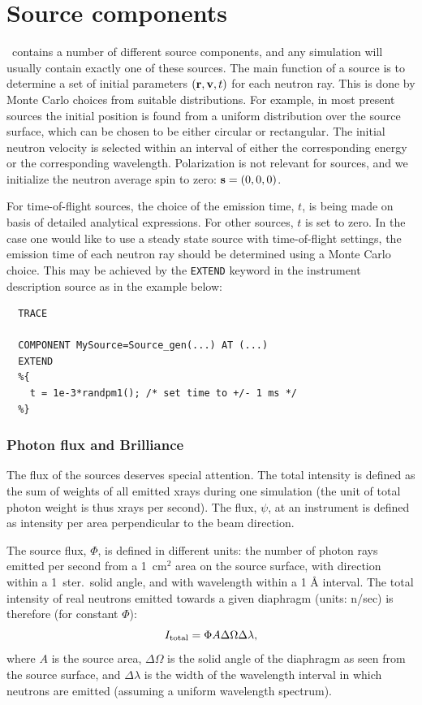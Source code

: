 
\chapter{Source components}
\label{c:source}

\MCS\ contains a number of different source components,
and any simulation will usually contain exactly one of these sources.
The main function of a source is to determine a set of initial
parameters $({\bf r}, {\bf v}, t)$
for each neutron ray. This is done by Monte Carlo choices from
suitable distributions. For example, in most present sources
the initial position is
found from a uniform distribution over the source surface,
which can be chosen to be either circular or rectangular.
The initial neutron velocity is selected within an interval
of either the corresponding energy or the corresponding wavelength.
Polarization is not relevant for sources,
and we initialize the neutron average spin to zero: ${\bf s}=(0,0,0)$.

For time-of-flight sources, the choice of the emission time, $t$,
is being made on basis of detailed analytical expressions.
For other sources, $t$ is set to zero.
In the case one would like to use a steady state source
with time-of-flight settings,
the emission time of each neutron ray should be determined using
a Monte Carlo choice. This may be achieved by
the \verb+EXTEND+ keyword in the instrument description source
as in the example below:

\begin{verbatim}
  TRACE

  COMPONENT MySource=Source_gen(...) AT (...)
  EXTEND
  %{
    t = 1e-3*randpm1(); /* set time to +/- 1 ms */
  %}
\end{verbatim}

\subsection{Photon flux and Brilliance}
\label{s:xray-flux}
The flux of the sources deserves special attention. The total
intensity is defined as the sum of weights of all emitted xrays
during one simulation
(the unit of total photon weight is thus xrays per second).
The flux, $\psi$, at an instrument is defined as intensity per area perpendicular
to the beam direction.

The source flux, $\Phi$, is defined in different units:
the number of photon rays emitted per second from a
1~cm$^2$ area on the source surface,
with direction within a 1~ster.\ solid angle,
and with wavelength within a 1 {\AA} interval.
The total intensity of real neutrons emitted towards a given diaphragm
(units: n/sec) is therefore (for constant $\Phi$):
\begin{equation}
I_{\rm total} = \Phi A \Delta\Omega \Delta\lambda ,
\end{equation}
where $A$ is the source area, $\Delta\Omega$ is the solid angle of the
diaphragm as seen from the source surface, and $\Delta\lambda$ is the
width of the wavelength interval in which neutrons are emitted (assuming
a uniform wavelength spectrum).

